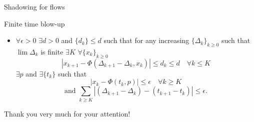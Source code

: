 \documentclass{beamer}
\begin{document}
\begin{section}{Shadowing for flows}
\begin{frame}{Finite time blow-up}
\begin{itemize}
	\item $\forall \epsilon>0$ $\exists d>0$ and $\{d_k\}\leq d$ such that for any increasing $\{\Delta_k\}_{k\geq0}$ such that $\lim\Delta_k$ is finite $\exists K$ $\forall\{x_k\}_{k\geq0}$
	$$|x_{k+1} - \Phi(\Delta_{k+1} - \Delta_k, x_k)|\leq d_k\leq d\quad\forall k\leq K$$
	$\exists p$ and $\exists \{t_k\}$ such that 
	$$|x_k - \Phi(t_k,p)|\leq\epsilon\quad\forall k\geq K$$
	$$\mbox{and }\sum_{k\geq K}|(\Delta_{k+1} - \Delta_k) - (t_{k+1} - t_k)|\leq\epsilon.$$		 
\end{itemize}
\end{frame}
\begin{frame}
\begin{center}
Thank you very much for your attention!
\end{center}
\end{frame}
\end{section}
\end{document}
